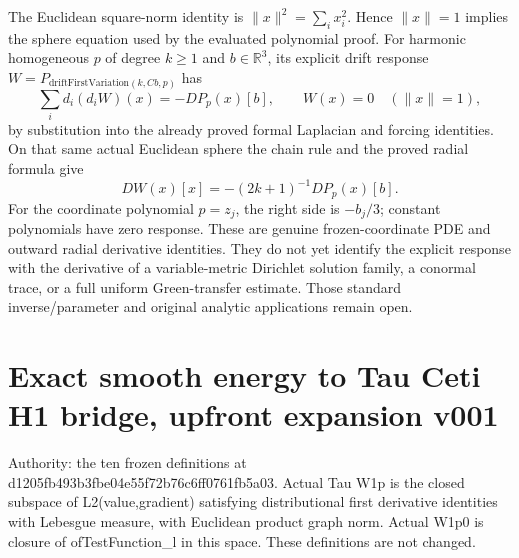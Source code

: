 \documentclass[11pt]{article}
\theoremstyle{definition}
\theoremstyle{remark}
\numberwithin{equation}{section}
\begin{document}
The Euclidean square-norm identity is
$\|x\|^2=\sum_i x_i^2$. Hence $\|x\|=1$ implies the sphere equation
used by the evaluated polynomial proof. For harmonic homogeneous $p$ of
degree $k\ge1$ and $b\in\mathbb R^3$, its explicit drift response
$W=P_{\mathrm{driftFirstVariation}(k,Cb,p)}$ has
\[
 \sum_i d_i(d_iW)(x)=-DP_p(x)[b],\qquad
 W(x)=0\quad(\|x\|=1),
\]
by substitution into the already proved formal Laplacian and forcing
identities. On that same actual Euclidean sphere the chain rule and the
proved radial formula give
\[
 DW(x)[x]=-(2k+1)^{-1}DP_p(x)[b].
\]
For the coordinate polynomial $p=z_j$, the right side is $-b_j/3$;
constant polynomials have zero response. These are genuine frozen-coordinate
PDE and outward radial derivative identities. They do not yet identify the
explicit response with the derivative of a variable-metric Dirichlet solution
family, a conormal trace, or a full uniform Green-transfer estimate. Those
standard inverse/parameter and original analytic applications remain open.

\clearpage
\hypertarget{source-e1387282d54f-exact-smooth-energy-to-tau-ceti-h1-bridge-upfront-expansion-v001}{%
\section{Exact smooth energy to Tau Ceti H1 bridge, upfront expansion
v001}\label{source-e1387282d54f-exact-smooth-energy-to-tau-ceti-h1-bridge-upfront-expansion-v001}}

Authority: the ten frozen definitions at
d1205fb493b3fbe04e55f72b76c6ff0761fb5a03. Actual Tau W1p is the closed
subspace of L2(value,gradient) satisfying distributional first
derivative identities with Lebesgue measure, with Euclidean product
graph norm. Actual W1p0 is closure of ofTestFunction\_l in this space.
These definitions are not changed.
\end{document}
